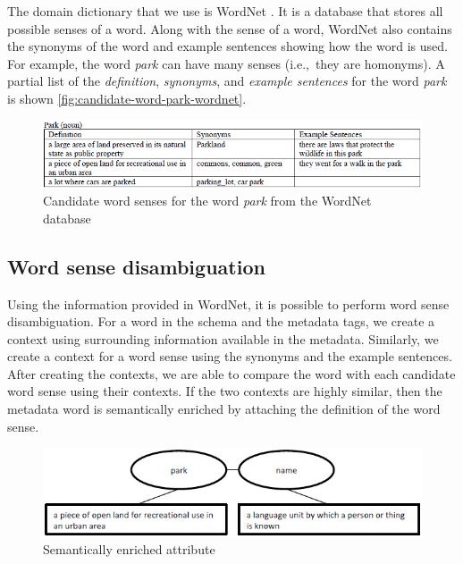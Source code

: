 The domain dictionary that we use is WordNet \cite{Fellbaum1998Computers}. It is a database that stores all possible senses of a word. Along with the sense of a word, WordNet also contains the synonyms of the word and example sentences showing how the word is used. For example, the word \textit{park} can have many senses (i.e.,~they are homonyms). A partial list of the \textit{definition}, \textit{synonyms}, and \textit{example sentences} for the word \textit{park} is shown \autoref{fig:candidate-word-park-wordnet}.

\begin{figure}
    \centering
    \includegraphics[width=5in]{figures/candidate-word-park-wordnet.png}
    \caption{Candidate word senses for the word \textit{park} from the WordNet database}
    \label{fig:candidate-word-park-wordnet}
\end{figure}

\subsection{Word sense disambiguation}

Using the information provided in WordNet, it is possible to perform word sense disambiguation. For a word in the schema and the metadata tags, we create a context using surrounding information available in the metadata. Similarly, we create a context for a word sense using the synonyms and the example sentences. After creating the contexts, we are able to compare the word with each candidate word sense using their contexts. If the two contexts are highly similar, then the metadata word is semantically enriched by attaching the definition of the word sense.

\begin{figure}
    \centering
    \includegraphics[width=5in]{figures/semantically-enriched-attribute.png}
    \caption{Semantically enriched attribute}
    \label{fig:semantically-enriched-attribute}
\end{figure}

